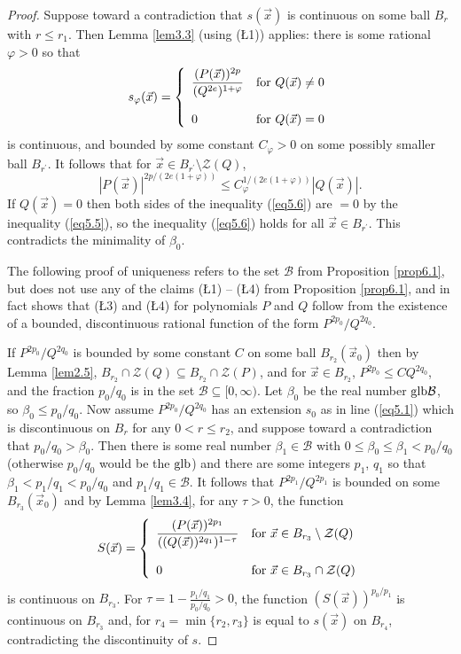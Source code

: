 \documentclass[12pt]{amsart}
\theoremstyle{definition}
\theoremstyle{remark}
\numberwithin{equation}{section}
\newcommand{\vv}{\mathcal{Z}}
\newcommand{\Bb}{\mathcal{B}}
\newcommand{\glb}{\mbox{\rm glb}}
\begin{document}
\begin{proof}
Suppose toward a contradiction that $s(\vec x)$ is continuous on some ball $B_r$ with $r\le r_1$.  Then Lemma \ref{lem3.3} (using (\L1)) applies: there is some rational $\varphi>0$ so that 
$$s_{\varphi}(\vec x)=\left\{\begin{array}{ll}{\displaystyle{\frac{(P(\vec x))^{2p}}{(Q^{2e})^{1+\varphi}}}} & \mbox{\rm{for} $Q(\vec x)\ne0$}\\ & \\0& \mbox{\rm{for} $Q(\vec x)=0$} \end{array}\right.$$
is continuous, and bounded by some constant $C_\varphi>0$ on some possibly smaller ball $B_{r^\prime}$.
It follows that for $\vec x\in B_{r^\prime}\setminus\vv(Q)$, 
\begin{equation}\label{eq5.6}
|P(\vec x)|^{2p/(2e(1+\varphi))}\le C_\varphi^{1/(2e(1+\varphi))}|Q(\vec x)|.
\end{equation}
If $Q(\vec x)=0$ then both sides of the inequality (\ref{eq5.6}) are $=0$ by the inequality (\ref{eq5.5}), so the inequality (\ref{eq5.6}) holds for all $\vec x\in B_{r^\prime}$.  This contradicts the minimality of $\beta_0$.

The following proof of uniqueness refers to the set $\Bb$ from Proposition \ref{prop6.1}, but does not use any of the claims (\L1) -- (\L4) from Proposition \ref{prop6.1}, and in fact shows that (\L3) and (\L4) for polynomials $P$ and $Q$ follow from the existence of a bounded, discontinuous rational function of the form $P^{2p_0}/Q^{2q_0}$.

If $P^{2p_0}/Q^{2q_0}$ is bounded by some constant $C$ on some ball $B_{r_2}(\vec x_0)$ then by Lemma \ref{lem2.5}, $B_{r_2}\cap\vv(Q)\subseteq B_{r_2}\cap\vv(P)$, and for $\vec x\in B_{r_2}$, $P^{2p_0}\le CQ^{2q_0}$, and the fraction $p_0/q_0$ is in the set $\Bb\subseteq[0,\infty)$.  Let $\beta_0$ be the real number $\glb\Bb$, so $\beta_0\le p_0/q_0$.  Now assume $P^{2p_0}/Q^{2q_0}$ has an extension $s_0$ as in line (\ref{eq5.1}) which is discontinuous on $B_r$ for any $0<r\le r_2$, and suppose toward a contradiction that $p_0/q_0>\beta_0$.  Then there is some real number $\beta_1\in\Bb$ with $0\le\beta_0\le\beta_1<p_0/q_0$ (otherwise $p_0/q_0$ would be the $\glb$) and there are some integers $p_1$, $q_1$ so that $\beta_1<p_1/q_1<p_0/q_0$ and $p_1/q_1\in\Bb$.  It follows that $P^{2p_1}/Q^{2p_1}$ is bounded on some $B_{r_3}(\vec x_0)$ and by Lemma \ref{lem3.4}, for any $\tau>0$, the function   $$S(\vec x)=\left\{\begin{array}{ll}{\displaystyle{\frac{(P(\vec x))^{2p_1}}{((Q(\vec x))^{2q_1})^{1-\tau}}}} & \mbox{\rm{for} $\vec x\in B_{r_3}\setminus\vv(Q)$}\\ & \\0& \mbox{\rm{for} $\vec x\in B_{r_3}\cap\vv(Q)$}\end{array}\right.$$
 is continuous on $B_{r_3}$.  For $\tau=1-\frac{p_1/q_1}{p_0/q_0}>0$, the function $(S(\vec x))^{p_0/p_1}$ is continuous on $B_{r_3}$ and, for $r_4=\min\{r_2,r_3\}$ is equal to $s(\vec x)$ on $B_{r_4}$, contradicting the discontinuity of $s$.
\end{proof}
\end{document}
